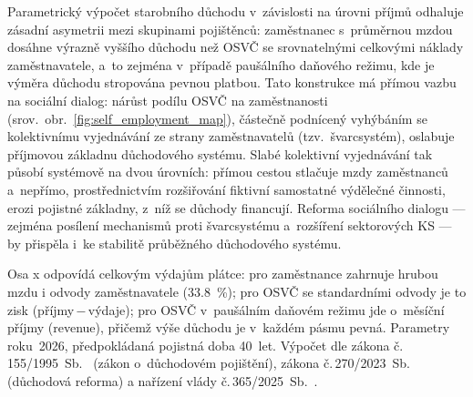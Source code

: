 Parametrický výpočet starobního důchodu v~závislosti na úrovni příjmů odhaluje zásadní asymetrii mezi skupinami pojištěnců: zaměstnanec s~průměrnou mzdou dosáhne výrazně vyššího důchodu než \ac{OSVČ} se srovnatelnými celkovými náklady zaměstnavatele, a~to zejména v~případě paušálního daňového režimu, kde je výměra důchodu stropována pevnou platbou.
Tato konstrukce má přímou vazbu na sociální dialog: nárůst podílu \ac{OSVČ} na zaměstnanosti (srov.~obr.~\ref{fig:self_employment_map}), částečně podnícený vyhýbáním se kolektivnímu vyjednávání ze strany zaměstnavatelů (tzv.\ švarcsystém), oslabuje příjmovou základnu důchodového systému.
Slabé kolektivní vyjednávání tak působí systémově na dvou úrovních: přímou cestou stlačuje mzdy zaměstnanců a~nepřímo, prostřednictvím rozšiřování fiktivní samostatné výdělečné činnosti, erozi pojistné základny, z~níž se důchody financují.
Reforma sociálního dialogu --- zejména posílení mechanismů proti švarcsystému a~rozšíření sektorových \ac{KS} --- by přispěla i~ke stabilitě průběžného důchodového systému.

 Osa x odpovídá celkovým výdajům plátce: pro zaměstnance zahrnuje hrubou mzdu i odvody zaměstnavatele (\SI{33.8}{\percent}); pro \ac{OSVČ} se standardními odvody je to zisk (příjmy\,$-$\,výdaje); pro \ac{OSVČ} v~paušálním daňovém režimu jde o~měsíční příjmy (revenue), přičemž výše důchodu je v~každém pásmu pevná. Parametry roku~2026, předpokládaná pojistná doba 40~let. Výpočet dle zákona č.\,155/1995~Sb.~\cite{zakon_zpds_1995} (zákon o~důchodovém pojištění), zákona č.\,270/2023~Sb.~\cite{zakon_duchreforma_2023} (důchodová reforma) a nařízení vlády č.\,365/2025~Sb.~\cite{nv_365_2025}.

